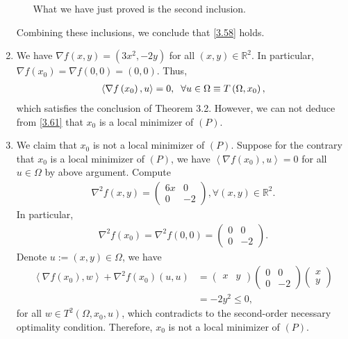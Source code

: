 \documentclass[a4paper]{article}
\numberwithin{equation}{section}
\begin{document}
\begin{enumerate}
\begin{enumerate}
\begin{itemize}
\end{itemize}
What we have just proved is the second inclusion.
\end{enumerate}
Combining these inclusions, we conclude that \eqref{3.58} holds.
\item We have $\nabla f\left( {x,y} \right) = \left( {3{x^2}, - 2y} \right)$ for all $\left(x,y\right)\in \mathbb{R}^2$. In particular, $\nabla f\left( {{x_0}} \right) = \nabla f\left( {0,0} \right) = \left( {0,0} \right)$. Thus, 
\begin{align}
\label{3.61}
\left\langle {\nabla f\left( {{x_0}} \right),u} \right\rangle  = 0,\hspace{0.2cm}\forall u \in \Omega  \equiv T\left( {\Omega ,{x_0}} \right),
\end{align}
which satisfies the conclusion of Theorem 3.2. However, we can not deduce from \eqref{3.61} that $x_0$ is a local minimizer of $\left(P\right)$. 
\item We claim that $x_0$ is not a local minimizer of $\left(P\right)$. Suppose for the contrary that $x_0$ is a local minimizer of $\left(P\right)$, we have $\left\langle {\nabla f\left( {{x_0}} \right),u} \right\rangle  = 0$ for all $u\in \Omega$ by above argument. Compute
\begin{align}
{\nabla ^2}f\left( {x,y} \right) = \left( {\begin{array}{*{20}{c}}
{6x}&0\\
0&{ - 2}
\end{array}} \right),\forall \left( {x,y} \right) \in {\mathbb{R}^2}.
\end{align}
In particular, 
\begin{align}
{\nabla ^2}f\left( {{x_0}} \right) = {\nabla ^2}f\left( {0,0} \right) = \left( {\begin{array}{*{20}{c}}
0&0\\
0&{ - 2}
\end{array}} \right).
\end{align}
Denote $u:=\left(x,y\right)\in \Omega$, we have
\begin{align}
\left\langle {\nabla f\left( {{x_0}} \right),w} \right\rangle  + {\nabla ^2}f\left( {{x_0}} \right)\left( {u,u} \right) &= \left( {\begin{array}{*{20}{c}}
x&y
\end{array}} \right)\left( {\begin{array}{*{20}{c}}
0&0\\
0&{ - 2}
\end{array}} \right)\left( {\begin{array}{*{20}{c}}
x\\
y
\end{array}} \right)\\
 &=  - 2{y^2} \le 0, 
\end{align}
for all $w\in T^2\left(\Omega,x_0,u\right)$, which contradicts to the second-order necessary optimality condition. Therefore, $x_0$ is not a local minimizer of $\left(P\right)$.
\end{enumerate}
\end{document}

